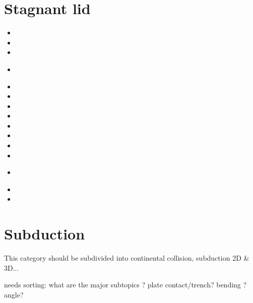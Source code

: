 \section{Stagnant lid} 

\begin{small}
\begin{itemize}
\item[\nineteenninetysix] 
\item[\nineteenninetyseven] 
\item[\nineteenninetyeight] 
\item[\nineteenninetynine] 
  \\ 
\item[\twothousand] 
\item[\twothousandtwo] 
\item[\twothousandfour] 
\item[\twothousandfive] 
\item[\twothousandnine] 
\item[\twothousandten] 
\item[\twothousandeleven] 
\item[\twothousandfourteen] 
\item[\twothousandsixteen] 
 \\ 
\item[\twothousandseventeen] 
\item[\twothousandtwentyfour] 
\end{itemize}
\end{small}


\section{Subduction} 
This category should be subdivided into continental collision, subduction 2D \& 3D...

{\color{red} needs sorting: what are the major subtopics ? plate contact/trench? bending ? 
angle? } 

